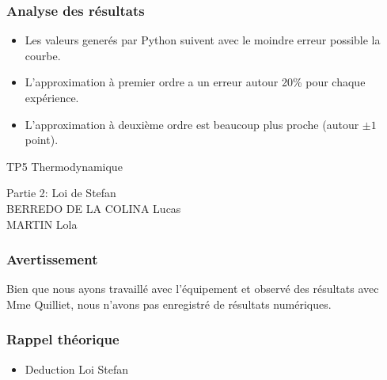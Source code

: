 \documentclass{beamer}
\begin{document}
\begin{frame}
\frametitle{Analyse des résultats}

\begin{itemize}
	\item{Les valeurs generés par Python suivent avec le moindre erreur possible la courbe.\newline}
	\item{L'approximation à premier ordre a un erreur autour 20\% pour chaque expérience.\newline}
	\item{L'approximation à deuxième ordre est beaucoup plus proche (autour $\pm1$ point).\newline}
\end{itemize}

\end{frame}






\begin{frame}

\Huge{TP5 Thermodynamique}

\Large{Partie 2: Loi de Stefan}
\\[2em]
\large{BERREDO DE LA COLINA Lucas\\ MARTIN Lola}

\end{frame}





\begin{frame}
\frametitle{Avertissement}
Bien que nous ayons travaillé avec l'équipement et observé des résultats avec Mme Quilliet, nous n'avons pas enregistré de résultats numériques.
\end{frame}





\begin{frame}
\frametitle{Rappel théorique}

\begin{itemize}
	\item{Deduction Loi Stefan}

\end{itemize}

\end{frame}
\end{document}
